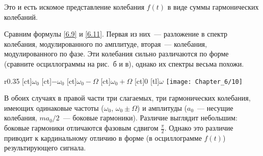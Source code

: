 Это и есть искомое представление колебания $f(t)$ в виде суммы гармонических колебаний.

Сравним формулы \eqref{6.9} и \eqref{6.11}. Первая из них~--- разложение в спектр колебания, модулированного по амплитуде,
вторая~--- колебания, модулированного по фазе. Эти колебания сильно различаются по форме (сравните осциллограммы на
рис.~б и в), однако их спектры весьма похожи.

\begin{wrapfigure}{r}{0.35\textwidth}
	\small
	[ct]{$\omega_0$}
	[ct]{$-\omega_0$}
	[ct]{$\omega_0-\Omega$}
	[ct]{$\omega_0+\Omega$}
	[ct]{0}
	[tl]{$\omega$}
	\texttt{[image: Chapter\_6/10]}
	\caption{}
\end{wrapfigure}

В обоих случаях в правой части три слагаемых, три гармонических колебания, имеющих одинаковые частоты ($\omega_0$,
$\omega_0\pm\Omega$) и амплитуды ($a_0$~--- несущие колебания, $ma_0/2$~--- боковые гармоники). Различие выглядит
небольшим: боковые гармоники отличаются фазовым сдвигом $\frac{\pi}{2}$. Однако это различие приводит к кардинальному
отличию в форме (в осциллограмме $f(t)$) результирующего сигнала. 


%

